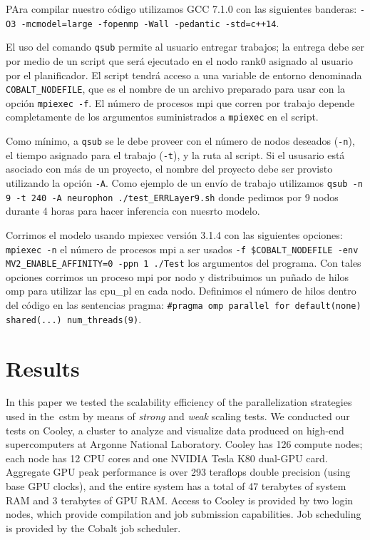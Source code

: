 {PAra compilar nuestro código utilizamos GCC 7.1.0 con las siguientes banderas: \texttt{-O3 -mcmodel=large -fopenmp -Wall -pedantic -std=c++14}.

El uso del comando \texttt{qsub} permite al usuario entregar trabajos; la entrega debe ser por medio de un script que será ejecutado en el nodo rank0 asignado al usuario por el planificador.
El script tendrá acceso a una variable de entorno denominada \texttt{COBALT\_NODEFILE}, que es el nombre de un archivo preparado para usar con la opción \texttt{mpiexec -f}. 
El número de procesos \gls{mpi} que corren por trabajo depende completamente de los argumentos suministrados a \texttt{mpiexec} en el script.

Como mínimo, a \texttt{qsub} se le debe proveer con el número de nodos deseados (\texttt{-n}), el tiempo asignado para el trabajo (\texttt{-t}), y la ruta al script.
Si el ususario está asociado con más de un proyecto, el nombre del proyecto debe ser provisto utilizando la opción \texttt{-A}.
Como ejemplo de un envío de trabajo utilizamos \texttt{qsub -n 9 -t 240 -A neurophon ./test\_ERRLayer9.sh} donde pedimos por 9 nodos durante 4 horas para hacer inferencia con nuesrto modelo.

Corrimos el modelo usando mpiexec versión 3.1.4 con las siguientes opciones: \texttt{mpiexec -n} el número de procesos \gls{mpi} a ser usados \texttt{-f \$COBALT\_NODEFILE -env MV2\_ENABLE\_AFFINITY=0 -ppn 1 ./Test} los argumentos del programa.
Con tales opciones corrimos un proceso \gls{mpi} por nodo y distribuimos un puñado de hilos \gls{omp} para utilizar las \gls{cpu_pl} en cada nodo.
Definimos el número de hilos dentro del código en las sentencias pragma: \texttt{\#pragma omp parallel for default(none) shared(...) num\_threads(9)}.
}{
\section{Results}

In this paper we tested the scalability efficiency of the parallelization strategies used in the~\gls{cstm} by means of \emph{strong} and \emph{weak} scaling tests. We conducted our tests on Cooley, a cluster to analyze and visualize data produced on high-end supercomputers at Argonne National Laboratory. Cooley has 126 compute nodes; each node has 12 CPU cores and one NVIDIA Tesla K80 dual-GPU card. Aggregate GPU peak performance is over 293 teraflops double precision (using base GPU clocks), and the entire system has a total of 47 terabytes of system RAM and 3 terabytes of GPU RAM. Access to Cooley is provided by two login nodes, which provide compilation and job submission capabilities. Job scheduling is provided by the Cobalt job scheduler.

}
